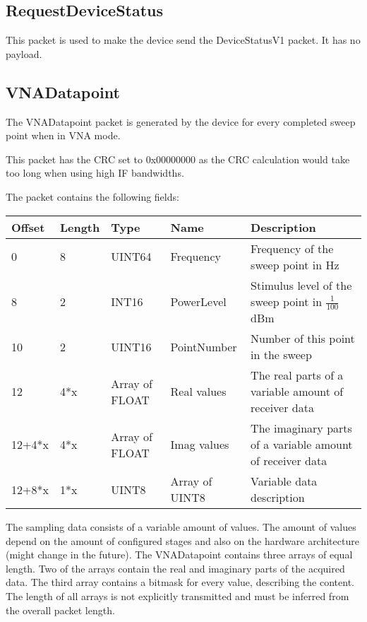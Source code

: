 \documentclass[a4paper,11pt]{article}
\newcommand\danger[1][5ex]{%
  \renewcommand\stacktype{L}%
  \scaleto{\stackon[1.3pt]{\color{red}$\triangle$}{\tiny !}}{#1}%
}
\newenvironment{important}[1][]{%
   \begin{mdframed}[%
      backgroundcolor={red!15}, hidealllines=true,
      skipabove=0.7\baselineskip, skipbelow=0.7\baselineskip,
      splitbottomskip=2pt, splittopskip=4pt, #1]%
   \makebox[0pt]{%
      \smash{%
         \hspace*{-45pt}%
         \raisebox{-5pt}{%
            {\danger}%
         }%
      }%
   }%
}{\end{mdframed}}
\begin{document}
\subsection{RequestDeviceStatus}
This packet is used to make the device send the DeviceStatusV1 packet. It has no payload.

\subsection{VNADatapoint}
The VNADatapoint packet is generated by the device for every completed sweep point when in VNA mode.
\begin{important}
This packet has the CRC set to 0x00000000 as the CRC calculation would take too long when using high IF bandwidths.
\end{important}

The packet contains the following fields:
\begin{ThreePartTable}
\setlength\tabcolsep{3pt}

\begin{longtable}{p{} |  p{}  |  p{}| p{} | p{}}
\toprule
\textbf{Offset} &\textbf{Length} &\textbf{Type} & \textbf{Name} &\textbf{Description} \\ 
\hline
\endhead
\midrule[\heavyrulewidth]
\endfoot  
\midrule[\heavyrulewidth]
\endlastfoot

0 & 8 & UINT64 & Frequency & Frequency of the sweep point in Hz\\
8 & 2 & INT16 & PowerLevel & Stimulus level of the sweep point in $\frac{1}{100}$dBm \\
10 & 2 & UINT16 & PointNumber & Number of this point in the sweep \\
12 & 4*x & Array of FLOAT & Real values & The real parts of a variable amount of receiver data \\
12+4*x & 4*x & Array of FLOAT & Imag values & The imaginary parts of a variable amount of receiver data \\
12+8*x & 1*x & UINT8 & Array of UINT8 & Variable data description \\
\end{longtable}   
\end{ThreePartTable}

The sampling data consists of a variable amount of values. The amount of values depend on the amount of configured stages and also on the hardware architecture (might change in the future). The VNADatapoint contains three arrays of equal length. Two of the arrays contain the real and imaginary parts of the acquired data. The third array contains a bitmask for every value, describing the content. The length of all arrays is not explicitly transmitted and must be inferred from the overall packet length.
\end{document}
